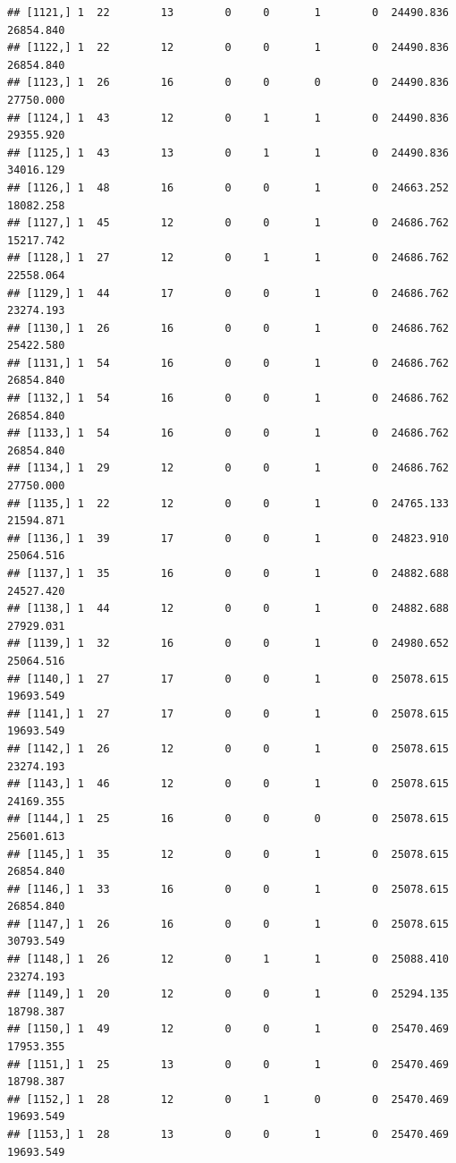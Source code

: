 \documentclass[
]{article}
\begin{document}
\begin{verbatim}
## [1121,] 1  22        13        0     0       1        0  24490.836  26854.840
## [1122,] 1  22        12        0     0       1        0  24490.836  26854.840
## [1123,] 1  26        16        0     0       0        0  24490.836  27750.000
## [1124,] 1  43        12        0     1       1        0  24490.836  29355.920
## [1125,] 1  43        13        0     1       1        0  24490.836  34016.129
## [1126,] 1  48        16        0     0       1        0  24663.252  18082.258
## [1127,] 1  45        12        0     0       1        0  24686.762  15217.742
## [1128,] 1  27        12        0     1       1        0  24686.762  22558.064
## [1129,] 1  44        17        0     0       1        0  24686.762  23274.193
## [1130,] 1  26        16        0     0       1        0  24686.762  25422.580
## [1131,] 1  54        16        0     0       1        0  24686.762  26854.840
## [1132,] 1  54        16        0     0       1        0  24686.762  26854.840
## [1133,] 1  54        16        0     0       1        0  24686.762  26854.840
## [1134,] 1  29        12        0     0       1        0  24686.762  27750.000
## [1135,] 1  22        12        0     0       1        0  24765.133  21594.871
## [1136,] 1  39        17        0     0       1        0  24823.910  25064.516
## [1137,] 1  35        16        0     0       1        0  24882.688  24527.420
## [1138,] 1  44        12        0     0       1        0  24882.688  27929.031
## [1139,] 1  32        16        0     0       1        0  24980.652  25064.516
## [1140,] 1  27        17        0     0       1        0  25078.615  19693.549
## [1141,] 1  27        17        0     0       1        0  25078.615  19693.549
## [1142,] 1  26        12        0     0       1        0  25078.615  23274.193
## [1143,] 1  46        12        0     0       1        0  25078.615  24169.355
## [1144,] 1  25        16        0     0       0        0  25078.615  25601.613
## [1145,] 1  35        12        0     0       1        0  25078.615  26854.840
## [1146,] 1  33        16        0     0       1        0  25078.615  26854.840
## [1147,] 1  26        16        0     0       1        0  25078.615  30793.549
## [1148,] 1  26        12        0     1       1        0  25088.410  23274.193
## [1149,] 1  20        12        0     0       1        0  25294.135  18798.387
## [1150,] 1  49        12        0     0       1        0  25470.469  17953.355
## [1151,] 1  25        13        0     0       1        0  25470.469  18798.387
## [1152,] 1  28        12        0     1       0        0  25470.469  19693.549
## [1153,] 1  28        13        0     0       1        0  25470.469  19693.549

\end{verbatim}
\end{document}
